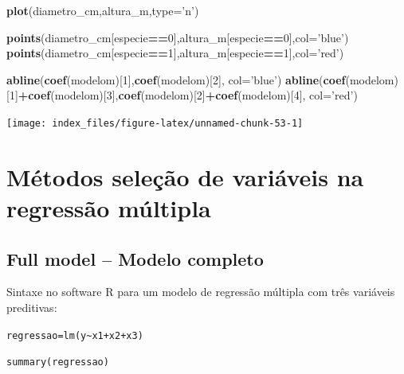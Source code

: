\documentclass[12pt,brazil,oneside]{book}
\newenvironment{Shaded}{\begin{snugshade}}{\end{snugshade}}
\newcommand{\DataTypeTok}[1]{\textcolor[rgb]{0.13,0.29,0.53}{#1}}
\newcommand{\DecValTok}[1]{\textcolor[rgb]{0.00,0.00,0.81}{#1}}
\newcommand{\KeywordTok}[1]{\textcolor[rgb]{0.13,0.29,0.53}{\textbf{#1}}}
\newcommand{\NormalTok}[1]{#1}
\newcommand{\OperatorTok}[1]{\textcolor[rgb]{0.81,0.36,0.00}{\textbf{#1}}}
\newcommand{\StringTok}[1]{\textcolor[rgb]{0.31,0.60,0.02}{#1}}
\begin{document}
\begin{Shaded}
\begin{Highlighting}[]
\KeywordTok{plot}\NormalTok{(diametro_cm,altura_m,}\DataTypeTok{type=}\StringTok{'n'}\NormalTok{)}

\KeywordTok{points}\NormalTok{(diametro_cm[especie}\OperatorTok{==}\DecValTok{0}\NormalTok{],altura_m[especie}\OperatorTok{==}\DecValTok{0}\NormalTok{],}\DataTypeTok{col=}\StringTok{'blue'}\NormalTok{)}
\KeywordTok{points}\NormalTok{(diametro_cm[especie}\OperatorTok{==}\DecValTok{1}\NormalTok{],altura_m[especie}\OperatorTok{==}\DecValTok{1}\NormalTok{],}\DataTypeTok{col=}\StringTok{'red'}\NormalTok{)}

\KeywordTok{abline}\NormalTok{(}\KeywordTok{coef}\NormalTok{(modelom)[}\DecValTok{1}\NormalTok{],}\KeywordTok{coef}\NormalTok{(modelom)[}\DecValTok{2}\NormalTok{], }\DataTypeTok{col=}\StringTok{'blue'}\NormalTok{)}
\KeywordTok{abline}\NormalTok{(}\KeywordTok{coef}\NormalTok{(modelom)[}\DecValTok{1}\NormalTok{]}\OperatorTok{+}\KeywordTok{coef}\NormalTok{(modelom)[}\DecValTok{3}\NormalTok{],}\KeywordTok{coef}\NormalTok{(modelom)[}\DecValTok{2}\NormalTok{]}\OperatorTok{+}\KeywordTok{coef}\NormalTok{(modelom)[}\DecValTok{4}\NormalTok{], }\DataTypeTok{col=}\StringTok{'red'}\NormalTok{)}
\end{Highlighting}
\end{Shaded}

\begin{center}\texttt{[image: index\_files/figure-latex/unnamed-chunk-53-1]} \end{center}

\hypertarget{metodos-selecao-de-variaveis-na-regressao-multipla}{%
\section{Métodos seleção de variáveis na regressão múltipla}\label{metodos-selecao-de-variaveis-na-regressao-multipla}}

\hypertarget{full-model-modelo-completo}{%
\subsection{Full model -- Modelo completo}\label{full-model-modelo-completo}}

Sintaxe no software R para um modelo de regressão múltipla com três variáveis preditivas:

\texttt{regressao=lm(y\textasciitilde{}x1+x2+x3)}

\texttt{summary(regressao)}
\end{document}
